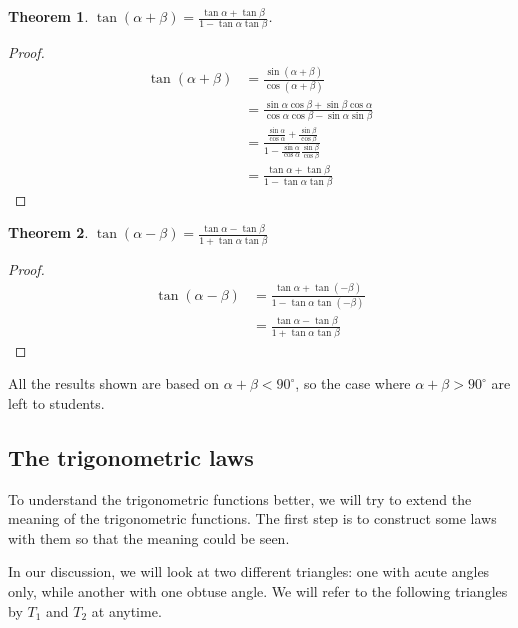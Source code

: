\documentclass[12pt]{article}
\newtheorem*{theorem}{Theorem}
\begin{document}
    \begin{theorem}
        $\tan(\alpha+\beta)=\frac{\tan{\alpha}+\tan{\beta}}{1-\tan{\alpha}\tan{\beta}}$.
    \end{theorem}

    \begin{proof}
        \begin{align*}
            \tan(\alpha+\beta)&=\frac{\sin(\alpha+\beta)}{\cos(\alpha+\beta)}\\&=\frac{\sin{\alpha}\cos{\beta}+\sin{\beta}\cos{\alpha}}{\cos{\alpha}\cos{\beta}-\sin{\alpha}\sin{\beta}}\\&=\frac{\frac{\sin{\alpha}}{\cos{\alpha}}+\frac{\sin{\beta}}{\cos{\beta}}}{1-\frac{\sin{\alpha}}{\cos{\alpha}}\frac{\sin{\beta}}{\cos{\beta}}}\\&=\frac{\tan{\alpha}+\tan{\beta}}{1-\tan{\alpha}\tan{\beta}}
        \end{align*}
    \end{proof}

    \begin{theorem}
        $\tan(\alpha-\beta)=\frac{\tan{\alpha}-\tan{\beta}}{1+\tan{\alpha}\tan{\beta}}$
    \end{theorem}

    \begin{proof}
        \begin{align*}
            \tan(\alpha-\beta)&=\frac{\tan{\alpha}+\tan(-\beta)}{1-\tan{\alpha}\tan(-\beta)}\\
            &=\frac{\tan{\alpha}-\tan{\beta}}{1+\tan{\alpha}\tan{\beta}}
        \end{align*}
    \end{proof}

    All the results shown are based on $\alpha+\beta<90^\circ$, so the case where $\alpha+\beta>90^\circ$ are left to students.

    \subsection{The trigonometric laws}

    To understand the trigonometric functions better, we will try to extend the meaning of the trigonometric functions. The first step is to construct some laws with them so that the meaning could be seen.

    In our discussion, we will look at two different triangles: one with acute angles only, while another with one obtuse angle. We will refer to the following triangles by $T_1$ and $T_2$ at anytime.
\end{document}
